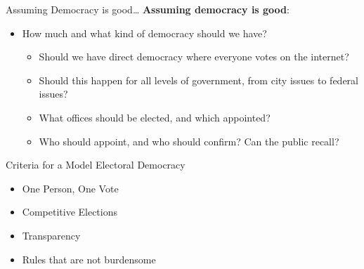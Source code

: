 \documentclass[
  ignorenonframetext,
  aspectratio=169]{beamer}
\providecommand{\tightlist}{%
  \setlength{\itemsep}{0pt}\setlength{\parskip}{0pt}}
\begin{document}
\begin{frame}{Assuming Democracy is good\ldots{}}
\protect\hypertarget{assuming-democracy-is-good}{}
\textbf{Assuming democracy is good}:

\begin{itemize}
\item
  How much and what kind of democracy should we have?

  \begin{itemize}
  \item
    Should we have direct democracy where everyone votes on the
    internet?
  \item
    Should this happen for all levels of government, from city issues to
    federal issues?
  \item
    What offices should be elected, and which appointed?
  \item
    Who should appoint, and who should confirm? Can the public recall?
  \end{itemize}
\end{itemize}
\end{frame}

\begin{frame}{Criteria for a Model Electoral Democracy}
\protect\hypertarget{criteria-for-a-model-electoral-democracy}{}

\begin{itemize}
\tightlist
\item
  One Person, One Vote
\item
  Competitive Elections
\item
  Transparency
\item
  Rules that are not burdensome
\end{itemize}
\end{frame}
\end{document}

